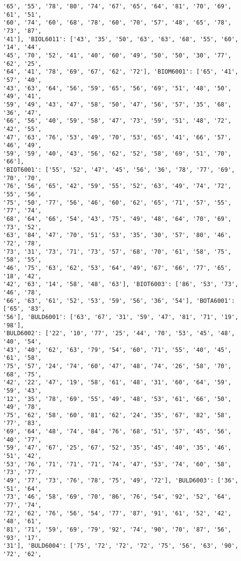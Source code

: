 \documentclass[11pt]{article}
\begin{document}
\begin{Verbatim}[commandchars=\\\{\}]
'65', '55', '78', '80', '74', '67', '65', '64', '81', '70', '69', '61', '51',
'60', '74', '60', '68', '78', '60', '70', '57', '48', '65', '78', '73', '87',
'41'], 'BIOL6011': ['43', '35', '50', '63', '63', '68', '55', '60', '14', '44',
'45', '70', '52', '41', '40', '60', '49', '50', '50', '30', '77', '62', '25',
'64', '41', '78', '69', '67', '62', '72'], 'BIOM6001': ['65', '41', '57', '40',
'43', '63', '64', '56', '59', '65', '56', '69', '51', '48', '50', '49', '41',
'59', '49', '43', '47', '58', '50', '47', '56', '57', '35', '68', '36', '47',
'66', '56', '40', '59', '58', '47', '73', '59', '51', '48', '72', '42', '55',
'47', '63', '76', '53', '49', '70', '53', '65', '41', '66', '57', '46', '49',
'59', '59', '40', '43', '56', '62', '52', '58', '69', '51', '70', '66'],
'BIOT6001': ['55', '52', '47', '45', '56', '36', '78', '77', '69', '70', '70',
'76', '56', '65', '42', '59', '55', '52', '63', '49', '74', '72', '55', '56',
'75', '50', '77', '56', '46', '60', '62', '65', '71', '57', '55', '77', '74',
'68', '64', '66', '54', '43', '75', '49', '48', '64', '70', '69', '73', '52',
'63', '84', '47', '70', '51', '53', '35', '30', '57', '80', '46', '72', '78',
'73', '31', '73', '71', '73', '57', '68', '70', '61', '58', '75', '58', '55',
'46', '75', '63', '62', '53', '64', '49', '67', '66', '77', '65', '18', '42',
'42', '63', '14', '58', '48', '63'], 'BIOT6003': ['86', '53', '73', '46', '78',
'66', '63', '61', '52', '53', '59', '56', '36', '54'], 'BOTA6001': ['65', '83',
'56'], 'BULD6001': ['63', '67', '31', '59', '47', '81', '71', '19', '98'],
'BULD6002': ['22', '10', '77', '25', '44', '70', '53', '45', '48', '40', '54',
'43', '40', '62', '63', '79', '54', '60', '71', '55', '40', '45', '61', '58',
'75', '57', '24', '74', '60', '47', '48', '74', '26', '58', '70', '68', '75',
'42', '22', '47', '19', '58', '61', '48', '31', '60', '64', '59', '59', '43',
'12', '35', '78', '69', '55', '49', '48', '53', '61', '66', '50', '49', '78',
'75', '62', '58', '60', '81', '62', '24', '35', '67', '82', '58', '77', '83',
'69', '64', '48', '74', '84', '76', '68', '51', '57', '45', '56', '40', '77',
'59', '47', '67', '25', '67', '52', '35', '45', '40', '35', '46', '51', '42',
'53', '76', '71', '71', '71', '74', '47', '53', '74', '60', '58', '73', '77',
'49', '77', '73', '76', '78', '75', '49', '72'], 'BULD6003': ['36', '51', '64',
'73', '46', '58', '69', '70', '86', '76', '54', '92', '52', '64', '77', '74',
'72', '62', '76', '56', '54', '77', '87', '91', '61', '52', '42', '48', '61',
'81', '71', '59', '69', '79', '92', '74', '90', '70', '87', '56', '93', '17',
'31'], 'BULD6004': ['75', '72', '72', '72', '75', '56', '63', '90', '72', '62',

\end{Verbatim}
\end{document}
